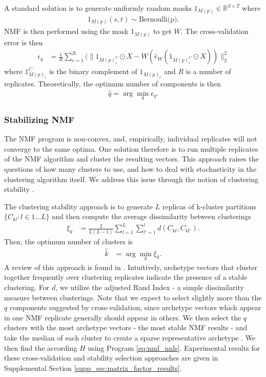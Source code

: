 A standard solution is to generate uniformly random masks $1_{M(p)} \in \mathbb R^{S \times T}$ where
\begin{align*}
1_{M(p)} (s,t) \sim \text{Bernoulli(p)}.
\end{align*}
NMF is then performed using the mask $1_{M(p)}$ to get $W$.
The cross-validation error is then
\begin{align*}
\epsilon_q &= \frac{1}{R} \sum_{r = 1}^R (\|1_{M(p)_r^C} \odot X - W (\widehat e_W (1_{M(p)_r^C} \odot X ))\|_2^2 
\end{align*}
where $1_{M(p)_r}^C$ is the binary complement of $1_{M(p)_r}$ and $R$ is a number of replicates.
Theoretically, the optimum number of components is then
\begin{align*}
    \widehat q = \arg \min_q \epsilon_q.
\end{align*}

\subsubsection{Stabilizing NMF}

The NMF program is non-convex, and, empirically, individual replicates will not converge to the same optima.
One solution therefore is to run multiple replicates of the NMF algorithm and cluster the resulting vectors.
This approach raises the questions of how many clusters to use, and how to deal with stochasticity in the clustering algorithm itself.
We address this issue through the notion of clustering stability \citep{Von_Luxburg2010-lu}.

The clustering stability approach is to generate $L$ replicas of k-cluster partitions $\{C_{kl} : l \in 1 \dots L\}$ and then compute the average dissimilarity between clusterings
\begin{align*}
\xi_k &= \frac{2}{L(L - 1)} \sum_{l = 1}^{L} \sum_{l'= 1}^{l}  d(C_{kl}, C_{kl'}).
\end{align*}
Then, the optimum number of clusters is 
\begin{align*}
\hat k &= \arg \min_k \xi_k.
\end{align*}
A review of this approach is found in \citet{Von_Luxburg2010-qe}.
Intuitively, archetype vectors that cluster together frequently over clustering replicates indicate the presence of a stable clustering.
For $d$, we utilize the adjusted Rand Index - a simple dissimilarity measure between clusterings.
Note that we expect to select slightly more than the $q$ components suggested by cross-validation, since archetype vectors which appear in one NMF replicate generally should appear in others.
We then select the $q$ clusters with the most archetype vectors - the most stable NMF results - and take the median of each cluster to create a sparse representative archetype \citet{Wu2016-gg, Kotliar2019-yj}.
We then find the according $H$ using Program \ref{eq:nmf_nnls}.
Experimental results for these cross-validation and stability selection approaches are given in Supplemental Section \ref{supp_sec:matrix_factor_results}.

